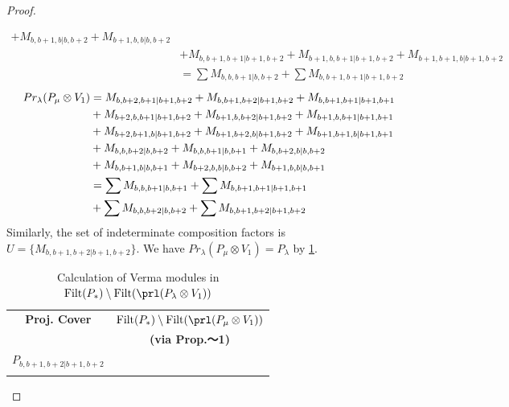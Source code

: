 \begin{proof}
\begin{enumerate}
\begin{enumerate}
\begin{equation}
\begin{aligned}
+M_{b,b+1,b|b,b+2}
+M_{b+1,b,b|b,b+2}\\
                                            &
+M_{b,b+1,b+1|b+1,b+2}
+M_{b+1,b,b+1|b+1,b+2}
+M_{b+1,b+1,b|b+1,b+2}\\
                  &=
\sum M_{b,b,b+1|b,b+2}
+\sum M_{b,b+1,b+1|b+1,b+2}
          \end{aligned}
        \end{equation}
        \begin{equation}\notag
          \begin{aligned}
            Pr_{\lambda}(P_\mu \otimes V_{1}) &=
M_{b,b+2,b+1|b+1,b+2}
+ M_{b,b+1,b+2|b+1,b+2}
+ M_{b,b+1,b+1|b+1,b+1}\\
                                            &
+ M_{b+2,b,b+1|b+1,b+2}
+ M_{b+1,b,b+2|b+1,b+2}
+ M_{b+1,b,b+1|b+1,b+1}\\
                                            &
+ M_{b+2,b+1,b|b+1,b+2}
+ M_{b+1,b+2,b|b+1,b+2}
+ M_{b+1,b+1,b|b+1,b+1}\\
                                            &
+ M_{b,b,b+2|b,b+2}
+ M_{b,b,b+1|b,b+1}
+ M_{b,b+2,b|b,b+2}\\
                                            &
+ M_{b,b+1,b|b,b+1}
+ M_{b+2,b,b|b,b+2}
+ M_{b+1,b,b|b,b+1} \\
                                               &=
\sum M_{b,b,b+1|b,b+1}
+ \sum M_{b,b+1,b+1|b+1,b+1}\\
                                            &
+ \sum M_{b,b,b+2|b,b+2}
+ \sum M_{b,b+1,b+2|b+1,b+2}
          \end{aligned}
        \end{equation}
      Similarly, the set of indeterminate composition factors is $U = \{
M_{b,b+1,b+2|b+1,b+2}
\}$. We have $Pr_{\lambda}(P_\mu \otimes V_{1}) = P_\lambda  $ by \cref{tab:verma-analysis_22}.
\begin{table}[htbp]
\centering
\caption{Calculation of Verma modules in $\operatorname{Filt}(P_*) \setminus \operatorname{Filt}(\prl(P_\lambda \otimes V_{1})) $ } \label{tab:verma-analysis_22}
\begin{tabular}{cc}
\toprule
\textbf{Proj. Cover} & \textbf{$\operatorname{Filt}(P_*) \setminus \operatorname{Filt}(\prl(P_\mu \otimes V_{1})) $}  \\
     & \textbf{(via Prop.～1)}  \\
\midrule
 $P_{b,b+1,b+2|b+1,b+2}$ & \makecell{
 $M_{b,b+2,b+2|b+2,b+2}$,
 $M_{b,b+1,b+3|b+1,b+3}$,
 $M_{b,b+3,b+2|b+2,b+3}$,
 $M_{b+1,b,b+2|b+1,b+2}$, \\
}
\end{tabular}
\end{table}
\end{enumerate}
\end{enumerate}
\end{proof}
